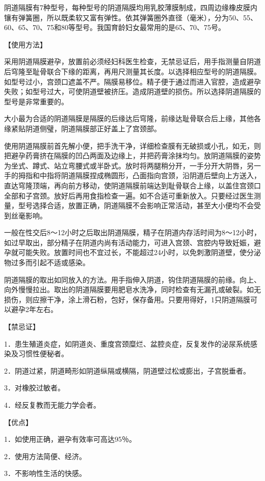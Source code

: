 \documentclass[12pt,UTF8,openany]{ctexbook}
\begin{document}
阴道隔膜有7种型号，每种型号的阴道隔膜均用乳胶薄膜制成，四周边缘橡皮膜内镶有弹簧圈，所以既柔软又富有弹性。依其弹簧圈外直径（毫米），分为50、55、60、65、70、75和80等型号。我国育龄妇女最常用的是65、70、75号。

【使用方法】

采用阴道隔膜避孕，放置前必须经妇科医生检查，无禁忌证后，用手指测量自阴道后穹隆至耻骨联合下缘的距离，再用尺测量其长度。以选择相应型号的阴道隔膜。如型号过小，宫颈口遮盖不严。隔膜易移位。精子便于通过而进入官腔，造成避孕失败；如型号过大，可使阴道壁被挤压。造成阴道壁的损伤。所以选择阴道隔膜的型号是非常重要的。

大小最为合适的阴道隔膜是隔膜的后缘达后穹隆，前缘达耻骨联合后上缘，其他各缘紧贴阴道侧璧，阴道隔膜部正好盖上了宫颈部。

使用阴道隔膜前首先解小便，把手洗干净，详细检查膜有无破损或小孔，如无，则把避孕药膏挤在隔膜的凹凸两面及边缘上，并把药膏涂抹均匀。放阴道隔膜的姿势为坐式、蹲式、站立弯腰式或半卧式。放时将两腿稍分开，一手分开大阴唇，另一手的拇指和中指将阴道隔膜捏成椭圆形，凸面指向宫颈，沿阴道后壁向上方送入，直达穹隆顶端，再向前方移动，使阴道隔膜前端达到耻骨联合上缘，以盖住宫颈口全部和子宫颈。放好后再用食指检查一遍。如不合适可重新放入。只要经过医生测量，型号选择合适，放置正确，阴道隔膜不会影响正常活动，甚至大小便均不会受到丝毫影响。

一般在性交后8～12小时之后取出阴道隔膜，精子在阴道内存活时间为8～12小时，如过早取出，部分精子在阴道内尚有活动能力，可进入宫颈、宫腔内导致妊娠，避孕就可能失败。放置时间也不宜过长，不能超过24小时，以免刺激阴道壁，使分泌物过多而引起不适或感染。

阴道隔膜的取出如同放入的方法。用手指伸入阴道，钩住阴道隔膜的前缘。向上、向外慢慢拉出。取出的阴道隔膜要用肥皂水洗净，同时检查有无漏孔或破裂。如无损伤，则应擦干净，涂上滑石粉，包好，保存备用。只要用得好，1只阴道隔膜可以避孕2年左右。

【禁忌证】

1．患生殖道炎症，如阴道炎、重度宫颈糜烂、盆腔炎症，反复发作的泌尿系统感染及习惯性便秘者。

2．阴道过紧，阴道畸形如阴道纵隔或横隔，阴道壁过松或膨出，子宫脱垂者。

3．对橡胶过敏者。

4．经反复教而无能力学会者。

【优点】

1．如使用正确，避孕有效率可高达95％。

2．使用方法简便、经济。

3．不影响性生活的快感。
\end{document}
